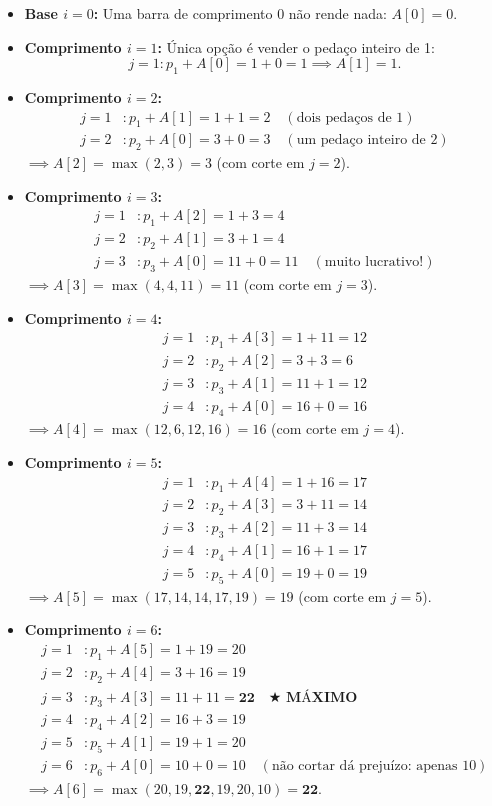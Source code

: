 \documentclass[11pt,a4paper]{article}
\begin{document}
\begin{itemize}
    \item \textbf{Base $i = 0$:} Uma barra de comprimento 0 não rende nada: $A[0] = 0$.
    \item \textbf{Comprimento $i = 1$:} Única opção é vender o pedaço inteiro de 1:
    \[
    j = 1: p_1 + A[0] = 1 + 0 = 1 \implies A[1] = 1.
    \]
    \item \textbf{Comprimento $i = 2$:}
    \begin{align*}
    j = 1 &: p_1 + A[1] = 1 + 1 = 2 \quad (\text{dois pedaços de 1}) \\
    j = 2 &: p_2 + A[0] = 3 + 0 = 3 \quad (\text{um pedaço inteiro de 2})
    \end{align*}
    $\implies A[2] = \max(2, 3) = 3$ (com corte em $j=2$).
    \item \textbf{Comprimento $i = 3$:}
    \begin{align*}
    j = 1 &: p_1 + A[2] = 1 + 3 = 4 \\
    j = 2 &: p_2 + A[1] = 3 + 1 = 4 \\
    j = 3 &: p_3 + A[0] = 11 + 0 = 11 \quad (\text{muito lucrativo!})
    \end{align*}
    $\implies A[3] = \max(4, 4, 11) = 11$ (com corte em $j=3$).
    \item \textbf{Comprimento $i = 4$:}
    \begin{align*}
    j = 1 &: p_1 + A[3] = 1 + 11 = 12 \\
    j = 2 &: p_2 + A[2] = 3 + 3 = 6 \\
    j = 3 &: p_3 + A[1] = 11 + 1 = 12 \\
    j = 4 &: p_4 + A[0] = 16 + 0 = 16
    \end{align*}
    $\implies A[4] = \max(12, 6, 12, 16) = 16$ (com corte em $j=4$).
    \item \textbf{Comprimento $i = 5$:}
    \begin{align*}
    j = 1 &: p_1 + A[4] = 1 + 16 = 17 \\
    j = 2 &: p_2 + A[3] = 3 + 11 = 14 \\
    j = 3 &: p_3 + A[2] = 11 + 3 = 14 \\
    j = 4 &: p_4 + A[1] = 16 + 1 = 17 \\
    j = 5 &: p_5 + A[0] = 19 + 0 = 19
    \end{align*}
    $\implies A[5] = \max(17, 14, 14, 17, 19) = 19$ (com corte em $j=5$).
    \item \textbf{Comprimento $i = 6$:}
    \begin{align*}
    j = 1 &: p_1 + A[5] = 1 + 19 = 20 \\
    j = 2 &: p_2 + A[4] = 3 + 16 = 19 \\
    j = 3 &: p_3 + A[3] = 11 + 11 = \mathbf{22} \quad \bigstar \textbf{ MÁXIMO} \\
    j = 4 &: p_4 + A[2] = 16 + 3 = 19 \\
    j = 5 &: p_5 + A[1] = 19 + 1 = 20 \\
    j = 6 &: p_6 + A[0] = 10 + 0 = 10 \quad (\text{não cortar dá prejuízo: apenas 10})
    \end{align*}
    $\implies A[6] = \max(20, 19, \mathbf{22}, 19, 20, 10) = \mathbf{22}$.
\end{itemize}
\end{document}
